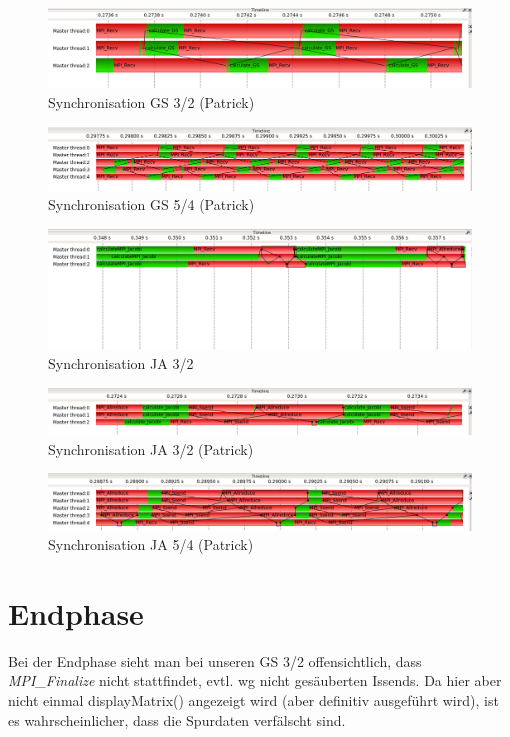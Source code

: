 \documentclass[a4paper,10pt]{article}
\begin{document}
\begin{figure}[h!]
 \caption{Synchronisation GS 3/2 (Patrick)}
 \includegraphics[width=14cm]{Patrick/c_sync_GS_3x2.png}
\end{figure}
\begin{figure}[h!]
 \caption{Synchronisation GS 5/4 (Patrick)}
 \includegraphics[width=14cm]{Patrick/c_sync_GS_5x4.png}
\end{figure}
\begin{figure}[h!]
 \caption{Synchronisation JA 3/2}
 \includegraphics[width=14cm]{c_sync_JA_3x2.png}
\end{figure}
\begin{figure}[h!]
 \caption{Synchronisation JA 3/2 (Patrick)}
 \includegraphics[width=14cm]{Patrick/c_sync_JA_3x2.png}
\end{figure}
\begin{figure}[h!]
 \caption{Synchronisation JA 5/4 (Patrick)}
 \includegraphics[width=14cm]{Patrick/c_sync_JA_5x4.png}
\end{figure}

\section{Endphase}
Bei der Endphase sieht man bei unseren GS 3/2 offensichtlich, dass \textit{MPI\_Finalize} nicht stattfindet, evtl. wg nicht gesäuberten Issends. Da hier aber nicht einmal displayMatrix() angezeigt wird (aber definitiv ausgeführt wird), ist es wahrscheinlicher, dass die Spurdaten verfälscht sind.\\
\end{document}
